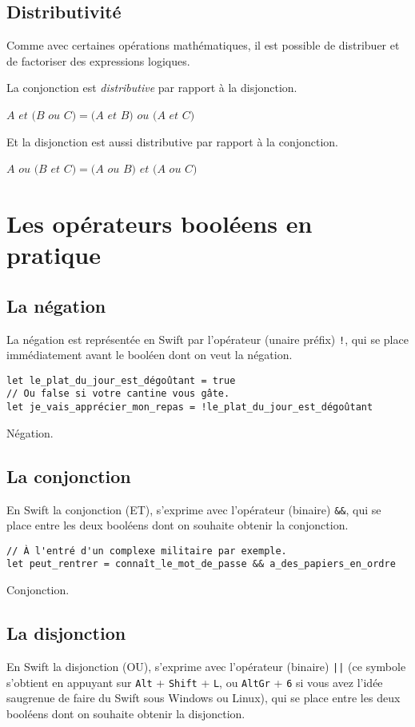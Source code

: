 \subsection{Distributivité}
Comme avec certaines opérations mathématiques, il est possible de distribuer et de factoriser des expressions logiques.

La conjonction est \emph{distributive} par rapport à la disjonction.

$A$ $et$ $(B$ $ou$ $C) = (A$ $et$ $B)$ $ou$ $(A$ $et$ $C)$

Et la disjonction est aussi distributive par rapport à la conjonction.

$A$ $ou$ $(B$ $et$ $C) = (A$ $ou$ $B)$ $et$ $(A$ $ou$ $C)$

\section{Les opérateurs booléens en pratique}
\subsection{La négation}
La négation est représentée en Swift par l'opérateur (unaire préfix) \verb"!", qui se place immédiatement avant le booléen dont on veut la négation.
\begin{listing}[h]
\begin{verbatim}
let le_plat_du_jour_est_dégoûtant = true
// Ou false si votre cantine vous gâte.
let je_vais_apprécier_mon_repas = !le_plat_du_jour_est_dégoûtant
\end{verbatim}
\caption{Négation.}
\end{listing}
\subsection{La conjonction}
En Swift la conjonction (ET), s'exprime avec l'opérateur (binaire) \verb"&&", qui se place entre les deux booléens dont on souhaite obtenir la conjonction.

\begin{listing}[h]
\begin{verbatim}
// À l'entré d'un complexe militaire par exemple.
let peut_rentrer = connaît_le_mot_de_passe && a_des_papiers_en_ordre
\end{verbatim}
\caption{Conjonction.}
\end{listing}
\subsection{La disjonction}
En Swift la disjonction (OU), s'exprime avec l'opérateur (binaire) \verb"||" (ce symbole s'obtient en appuyant sur \verb"Alt" + \verb"Shift" + \verb"L", ou \verb"AltGr" + \verb"6" si vous avez l'idée saugrenue de faire du Swift sous Windows ou Linux), qui se place entre les deux booléens dont on souhaite obtenir la disjonction.

